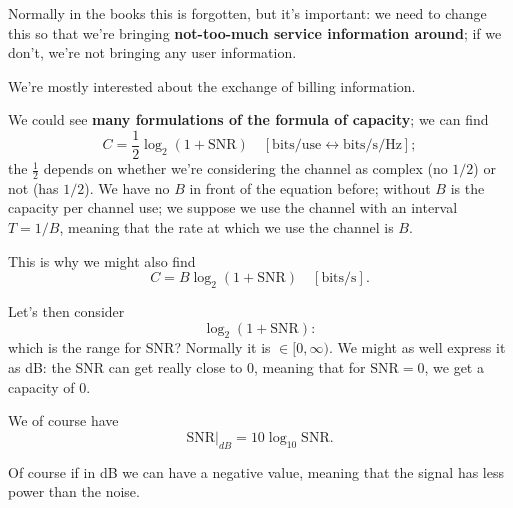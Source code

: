 \documentclass[a4paper, 12pt]{book}
\begin{document}
Normally in the books this is forgotten, but it's important: we need to change this so that we're bringing \textbf{not-too-much service information around}; if we don't, we're not bringing any user information.

\begin{center}
\end{center}

We're mostly interested about the exchange of billing information.

We could see \textbf{many formulations of the formula of capacity}; we can find
\begin{equation}
    C = \frac{1}{2}\log_2(1 + \text{SNR}) \quad [\text{bits/use} \leftrightarrow \text{bits/s/Hz}] ;
\end{equation}
the $\frac{1}{2}$ depends on whether we're considering the channel as complex (no $1/2$) or not (has $1/2$). We have no $B$ in front of the equation before; without $B$ is the capacity per channel use; we suppose we use the channel with an interval $T=1/B$, meaning that the rate at which we use the channel is $B$.

This is why we might also find
\begin{equation}
    C = B \log_2(1 + \text{SNR}) \quad [\text{bits/s}] .
\end{equation}

Let's then consider
\[
\log_2(1 + \text{SNR}) :
\]
which is the range for SNR? Normally it is $\in [0, \infty)$.
We might as well express it as dB: the SNR can get really close to 0, meaning that for $\text{SNR} = 0$, we get a capacity of 0.

We of course have
\[
\text{SNR}|_{dB} = 10 \log_{10} \text{SNR} .
\]

Of course if in dB we can have a negative value, meaning that the signal has less power than the noise.
\end{document}
